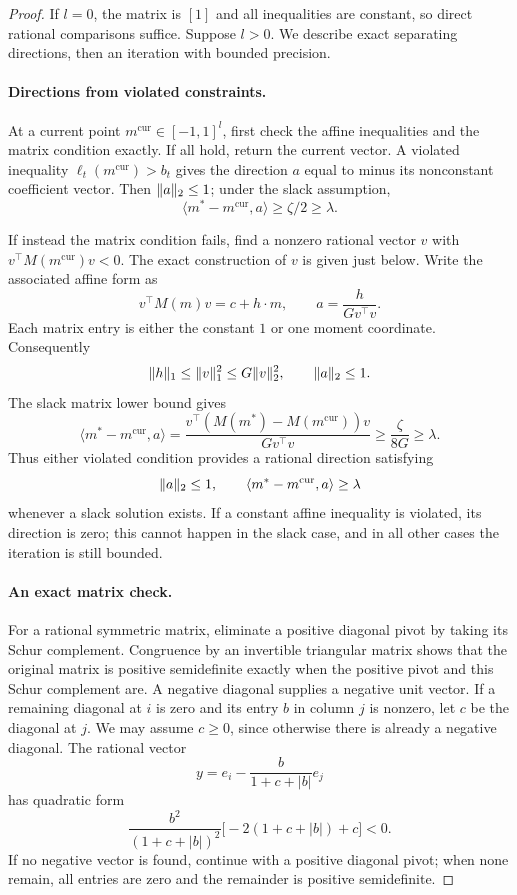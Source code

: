 \begin{proof}
If \(l=0\), the matrix is \([1]\) and all inequalities are constant,
so direct rational comparisons suffice.  Suppose \(l>0\).  We describe
exact separating directions, then an iteration with bounded precision.

\paragraph{Directions from violated constraints.}
At a current point \(m^{\mathrm{cur}}\in[-1,1]^l\), first check the
affine inequalities and the matrix condition exactly.  If all hold,
return the current vector.  A violated inequality
\(\ell_t(m^{\mathrm{cur}})>b_t\) gives the direction \(a\) equal to
minus its nonconstant coefficient vector.  Then \(\lVert a\rVert_2\le1\);
under the slack assumption,
\[
 \langle m^*-m^{\mathrm{cur}},a\rangle\ge\zeta/2\ge\lambda.
\]

If instead the matrix condition fails, find a nonzero rational vector
\(v\) with \(v^\top M(m^{\mathrm{cur}})v<0\).  The exact construction
of \(v\) is given just below.  Write the associated affine form as
\[
 v^\top M(m)v=c+h\cdot m,\qquad
 a=\frac{h}{Gv^\top v}.
\]
Each matrix entry is either the constant \(1\) or one moment
coordinate.  Consequently
\[
 \lVert h\rVert_1\le\lVert v\rVert_1^2\le G\lVert v\rVert_2^2,
 \qquad \lVert a\rVert_2\le1.
\]
The slack matrix lower bound gives
\[
 \langle m^*-m^{\mathrm{cur}},a\rangle
 =\frac{v^\top(M(m^*)-M(m^{\mathrm{cur}}))v}{Gv^\top v}
 \ge\frac{\zeta}{8G}\ge\lambda.
\]
Thus either violated condition provides a rational direction satisfying
\begin{equation}\label{eq:feasibility-direction}
 \lVert a\rVert_2\le1,\qquad
 \langle m^*-m^{\mathrm{cur}},a\rangle\ge\lambda
\end{equation}
whenever a slack solution exists.  If a constant affine inequality is
violated, its direction is zero; this cannot happen in the slack case,
and in all other cases the iteration is still bounded.

\paragraph{An exact matrix check.}
For a rational symmetric matrix, eliminate a positive diagonal pivot
by taking its Schur complement.  Congruence by an invertible triangular
matrix shows that the original matrix is positive semidefinite exactly
when the positive pivot and this Schur complement are.  A negative
diagonal supplies a negative unit vector.  If a remaining diagonal at
\(i\) is zero and its entry \(b\) in column \(j\) is nonzero, let \(c\)
be the diagonal at \(j\).  We may assume \(c\ge0\), since otherwise
there is already a negative diagonal.  The rational vector
\[
 y=e_i-\frac{b}{1+c+|b|}e_j
\]
has quadratic form
\[
 \frac{b^2}{(1+c+|b|)^2}
 \bigl[-2(1+c+|b|)+c\bigr]<0.
\]
If no negative vector is found, continue with a positive diagonal
pivot; when none remain, all entries are zero and the remainder is
positive semidefinite.


\end{proof}
